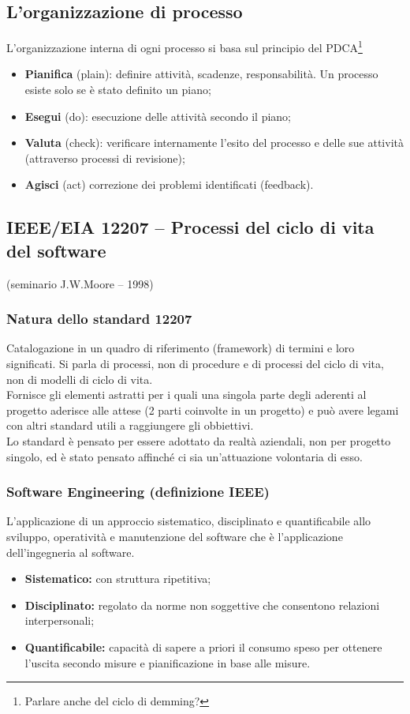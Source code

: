 \subsection{L'organizzazione di processo}
L'organizzazione interna di ogni processo si basa sul principio del PDCA\footnote{Parlare anche del ciclo di demming?}
\begin{itemize}
\item \textbf{Pianifica} (plain): definire attività, scadenze, responsabilità. Un processo esiste solo se è stato definito un piano;
\item \textbf{Esegui} (do): esecuzione delle attività secondo il piano;
\item \textbf{Valuta} (check): verificare internamente l'esito del processo e delle sue attività (attraverso processi di revisione);
\item \textbf{Agisci} (act) correzione dei problemi identificati (feedback).
\end{itemize}

\subsection{IEEE/EIA 12207 – Processi del ciclo di vita del software} 
(seminario J.W.Moore – 1998)
\subsubsection{Natura dello standard 12207}
Catalogazione in un quadro di riferimento (framework) di termini e loro significati. Si parla di processi, non di procedure e di processi del ciclo di vita, non di modelli di ciclo di vita. \\
Fornisce gli elementi astratti per i quali una singola parte degli aderenti al progetto aderisce alle attese (2 parti coinvolte in un progetto) e può avere legami con altri standard utili a raggiungere gli obbiettivi. \\
Lo standard è pensato per essere adottato da realtà aziendali, non per progetto singolo, ed è stato pensato affinché ci sia un'attuazione volontaria di esso.

\subsubsection{Software Engineering (definizione IEEE)}
L'applicazione di un approccio sistematico, disciplinato e quantificabile allo sviluppo, operatività e manutenzione del software che è l'applicazione dell'ingegneria al software.
\begin{itemize}
\item \textbf{Sistematico:} con struttura ripetitiva;
\item \textbf{Disciplinato:} regolato da norme non soggettive che consentono relazioni interpersonali;
\item \textbf{Quantificabile:} capacità di sapere a priori il consumo speso per ottenere l'uscita secondo misure e pianificazione in base alle misure.
\end{itemize}

